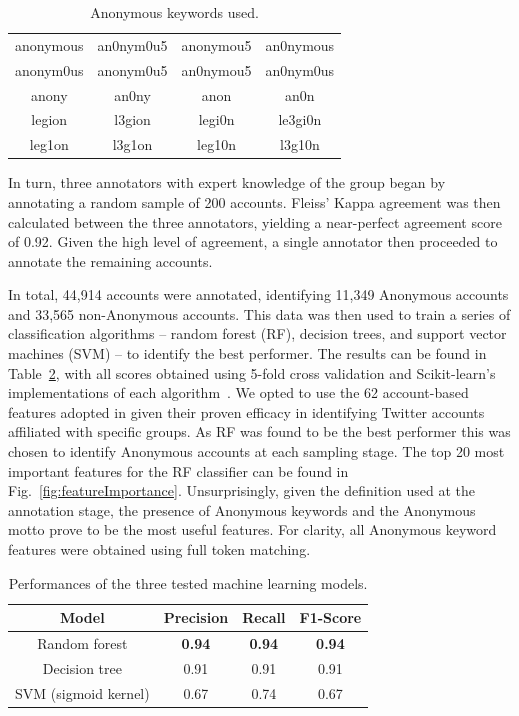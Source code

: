 \documentclass[letterpaper]{article}
\begin{document}
\begin{table}[!tbh]
\footnotesize
\centering
\begin{tabular}{ c c c c }
\toprule
anonymous & an0nym0u5 & anonymou5 & an0nymous \\
anonym0us & anonym0u5 & an0nymou5 & an0nym0us \\
anony & an0ny & anon & an0n\\
legion & l3gion & legi0n & le3gi0n\\
leg1on & l3g1on & leg10n & l3g10n\\
\bottomrule
\end{tabular}
\caption{Anonymous keywords used.}
\label{table:keywords}
\end{table}

In turn, three annotators with expert knowledge of the group began by annotating a random sample of 200 accounts. Fleiss' Kappa agreement was then calculated between the three annotators, yielding a near-perfect agreement score of 0.92. Given the high level of agreement, a single annotator then proceeded to annotate the remaining accounts.

In total, 44,914 accounts were annotated, identifying 11,349 Anonymous accounts and 33,565 non-Anonymous accounts. This data was then used to train a series of classification algorithms -- random forest (RF), decision trees, and support vector machines (SVM) -- to identify the best performer. The results can be found in Table~\ref{table:ML_performances}, with all scores obtained using 5-fold cross validation and Scikit-learn's implementations of each algorithm~\cite{Pedregosa2011}. We opted to use the 62 account-based features adopted in \cite{Jones2020} given their proven efficacy in identifying Twitter accounts affiliated with specific groups. As RF was found to be the best performer this was chosen to identify Anonymous accounts at each sampling stage. The top 20 most important features for the RF classifier can be found in Fig.~\ref{fig:featureImportance}. Unsurprisingly, given the definition used at the annotation stage, the presence of Anonymous keywords and the Anonymous motto prove to be the most useful features. For clarity, all Anonymous keyword features were obtained using full token matching.

\begin{table}[!tbh]
\footnotesize
\centering
\begin{tabular}{ c c c c }
\toprule
\textbf{Model} & \textbf{Precision} & \textbf{Recall} & \textbf{F1-Score} \\
\midrule
Random forest & \textbf{0.94} & \textbf{0.94} & \textbf{0.94} \\
Decision tree & 0.91 & 0.91 & 0.91\\
SVM (sigmoid kernel) & 0.67 & 0.74 & 0.67\\
\bottomrule
\end{tabular}
\caption{Performances of the three tested machine learning models.}
\label{table:ML_performances}
\end{table}
\end{document}
